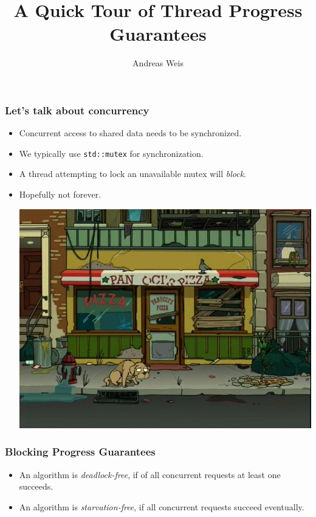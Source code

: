 \documentclass{beamer}
\title{A Quick Tour of Thread Progress Guarantees}
\author{Andreas Weis}
\institute{BMW AG}
\newif\iftransitions
\begin{document}
\frame{\titlepage}

\begin{frame}[fragile]
  \frametitle{Let's talk about concurrency}

  \begin{itemize}
\iftransitions \pause \fi
    \item Concurrent access to shared data needs to be synchronized.
\iftransitions \pause \fi
    \item We typically use \texttt{std::mutex} for synchronization.
\iftransitions \pause \fi
    \item A thread attempting to lock an unavailable mutex will \emph{block}.
\iftransitions \pause \fi
    \item Hopefully not forever.
    \begin{center}
        \includegraphics[height=0.4\textheight]{resources/waiting.jpg}
    \end{center}
  \end{itemize}
\end{frame}

\begin{frame}[fragile]
  \frametitle{Blocking Progress Guarantees}

  \begin{itemize}
    \setlength\itemsep{1.5em}

    \item An algorithm is \emph{deadlock-free}, if of all concurrent requests at least one succeeds.

    \iftransitions \pause \fi

    \item An algorithm is \emph{starvation-free}, if all concurrent requests succeed eventually.

  \end{itemize}
\end{frame}
\end{document}
